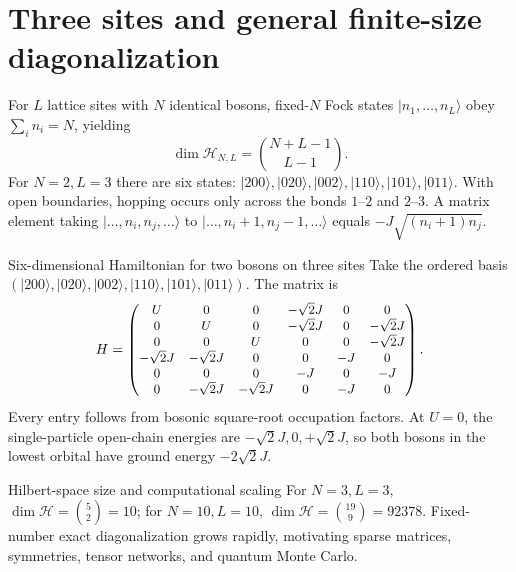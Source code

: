 \documentclass[11pt,a4paper]{article}
\begin{document}
\section{Three sites and general finite-size diagonalization}
For $L$ lattice sites with $N$ identical bosons, fixed-$N$ Fock states $|n_1,\dots,n_L\rangle$ obey $\sum_i n_i=N$, yielding
\begin{equation}\boxed{\dim\mathcal H_{N,L}=\binom{N+L-1}{L-1}.}\end{equation}
For $N=2,L=3$ there are six states: $|200\rangle,|020\rangle,|002\rangle,|110\rangle,|101\rangle,|011\rangle$. With open boundaries, hopping occurs only across the bonds $1$--$2$ and $2$--$3$. A matrix element taking $|\ldots,n_i,n_j,\ldots\rangle$ to $|\ldots,n_i+1,n_j-1,\ldots\rangle$ equals $-J\sqrt{(n_i+1)n_j}$.
\begin{worked}{Six-dimensional Hamiltonian for two bosons on three sites}
Take the ordered basis $(|200\rangle,|020\rangle,|002\rangle,|110\rangle,|101\rangle,|011\rangle)$. The matrix is
\[\small H=\begin{pmatrix}
U&0&0&-\sqrt2J&0&0\\
0&U&0&-\sqrt2J&0&-\sqrt2J\\
0&0&U&0&0&-\sqrt2J\\
-\sqrt2J&-\sqrt2J&0&0&-J&0\\
0&0&0&-J&0&-J\\
0&-\sqrt2J&-\sqrt2J&0&-J&0
\end{pmatrix}.\]
Every entry follows from bosonic square-root occupation factors. At $U=0$, the single-particle open-chain energies are $-\sqrt2J,0,+\sqrt2J$, so both bosons in the lowest orbital have ground energy $-2\sqrt2J$.
\end{worked}
\begin{worked}{Hilbert-space size and computational scaling}
For $N=3,L=3$, $\dim\mathcal H=\binom52=10$; for $N=10,L=10$, $\dim\mathcal H=\binom{19}{9}=92378$. Fixed-number exact diagonalization grows rapidly, motivating sparse matrices, symmetries, tensor networks, and quantum Monte Carlo.
\end{worked}
\end{document}
